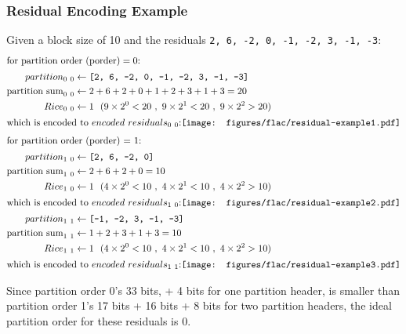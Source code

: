 \clearpage

\subsubsection{Residual Encoding Example}
Given a block size of 10 and the residuals \texttt{2, 6, -2, 0, -1, -2, 3, -1, -3}:
\begin{align*}
\intertext{for $\text{partition order (porder)} = 0$:}
partition_{0~0} &\leftarrow \texttt{[2, 6, -2, 0, -1, -2, 3, -1, -3]} \\
\text{partition sum}_{0~0} &\leftarrow 2 + 6 + 2 + 0 + 1 + 2 + 3 + 1 + 3 = 20 \\
Rice_{0~0} &\leftarrow 1~~(9 \times 2 ^ 0 < 20~,~9 \times 2 ^ 1 < 20~,~9 \times 2 ^ 2 > 20) \\
\intertext{which is encoded to $encoded~residuals_{0~0}$:
\newline
\texttt{[image: figures/flac/residual-example1.pdf]}}
\intertext{for partition order (porder) = 1:}
partition_{1~0} &\leftarrow \texttt{[2, 6, -2, 0]} \\
\text{partition sum}_{1~0} &\leftarrow 2 + 6 + 2 + 0 = 10 \\
Rice_{1~0} &\leftarrow 1~~(4 \times 2 ^ 0 < 10~,~4 \times 2 ^ 1 < 10~,~4 \times 2 ^ 2 > 10) \\
\intertext{which is encoded to $encoded~residuals_{1~0}$:
\newline
\texttt{[image: figures/flac/residual-example2.pdf]}}
partition_{1~1} &\leftarrow \texttt{[-1, -2, 3, -1, -3]} \\
\text{partition sum}_{1~1} &\leftarrow 1 + 2 + 3 + 1 + 3 = 10 \\
Rice_{1~1} &\leftarrow 1~~(4 \times 2 ^ 0 < 10~,~4 \times 2 ^ 1 < 10~,~4 \times 2 ^ 2 > 10) \\
\intertext{which is encoded to $encoded~residuals_{1~1}$:
\newline
\texttt{[image: figures/flac/residual-example3.pdf]}}
\end{align*}
\par
\noindent
Since partition order 0's 33 bits, + 4 bits for one partition header,
is smaller than partition order 1's 17 bits + 16 bits + 8 bits
for two partition headers, the ideal partition order for these residuals is 0.

\clearpage

